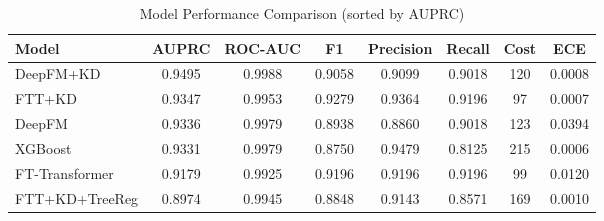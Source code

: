 \begin{table}[htbp]
\centering
\caption{Model Performance Comparison (sorted by AUPRC)}
\label{tab:model_comparison}
\small
\begin{tabular}{lccccccc}
\toprule
\textbf{Model} & \textbf{AUPRC} & \textbf{ROC-AUC} & \textbf{F1} & \textbf{Precision} & \textbf{Recall} & \textbf{Cost} & \textbf{ECE} \\
\midrule
DeepFM+KD & 0.9495 & 0.9988 & 0.9058 & 0.9099 & 0.9018 & 120 & 0.0008 \\
FTT+KD & 0.9347 & 0.9953 & 0.9279 & 0.9364 & 0.9196 & 97 & 0.0007 \\
DeepFM & 0.9336 & 0.9979 & 0.8938 & 0.8860 & 0.9018 & 123 & 0.0394 \\
XGBoost & 0.9331 & 0.9979 & 0.8750 & 0.9479 & 0.8125 & 215 & 0.0006 \\
FT-Transformer & 0.9179 & 0.9925 & 0.9196 & 0.9196 & 0.9196 & 99 & 0.0120 \\
FTT+KD+TreeReg & 0.8974 & 0.9945 & 0.8848 & 0.9143 & 0.8571 & 169 & 0.0010 \\
\bottomrule
\end{tabular}
\end{table}
